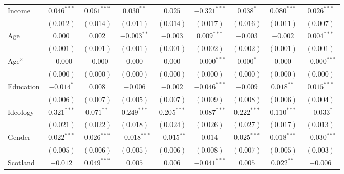 \documentclass{article}
\begin{document}
\begin{table}
\begin{center}
{\begin{tabular}{l c c c c c c c c }
Income                           & $0.046^{***}$  & $0.061^{***}$  & $0.030^{**}$   & $0.025$        & $-0.321^{***}$ & $0.038^{*}$    & $0.080^{***}$  & $0.026^{***}$  \\
                                 & $(0.012)$      & $(0.014)$      & $(0.011)$      & $(0.014)$      & $(0.017)$      & $(0.016)$      & $(0.011)$      & $(0.007)$      \\
Age                              & $0.000$        & $0.002$        & $-0.003^{**}$  & $-0.003$       & $0.009^{***}$  & $-0.003$       & $-0.002$       & $0.004^{***}$  \\
                                 & $(0.001)$      & $(0.001)$      & $(0.001)$      & $(0.001)$      & $(0.002)$      & $(0.002)$      & $(0.001)$      & $(0.001)$      \\
Age$^2$                            & $-0.000$       & $-0.000$       & $0.000$        & $0.000$        & $-0.000^{***}$ & $0.000^{*}$    & $0.000$        & $-0.000^{***}$ \\
                                 & $(0.000)$      & $(0.000)$      & $(0.000)$      & $(0.000)$      & $(0.000)$      & $(0.000)$      & $(0.000)$      & $(0.000)$      \\
Education                        & $-0.014^{*}$   & $0.008$        & $-0.006$       & $-0.002$       & $-0.046^{***}$ & $-0.009$       & $0.018^{**}$   & $0.015^{***}$  \\
                                 & $(0.006)$      & $(0.007)$      & $(0.005)$      & $(0.007)$      & $(0.009)$      & $(0.008)$      & $(0.006)$      & $(0.004)$      \\
Ideology                         & $0.321^{***}$  & $0.071^{**}$   & $0.249^{***}$  & $0.205^{***}$  & $-0.087^{***}$ & $0.222^{***}$  & $0.110^{***}$  & $-0.033^{*}$   \\
                                 & $(0.021)$      & $(0.022)$      & $(0.018)$      & $(0.024)$      & $(0.026)$      & $(0.027)$      & $(0.017)$      & $(0.013)$      \\
Gender                           & $0.022^{***}$  & $0.026^{***}$  & $-0.018^{***}$ & $-0.015^{**}$  & $0.014$        & $0.025^{***}$  & $0.018^{***}$  & $-0.030^{***}$ \\
                                 & $(0.005)$      & $(0.006)$      & $(0.005)$      & $(0.006)$      & $(0.008)$      & $(0.007)$      & $(0.005)$      & $(0.003)$      \\
Scotland                         & $-0.012$       & $0.049^{***}$  & $0.005$        & $0.006$        & $-0.041^{***}$ & $0.005$        & $0.022^{**}$   & $-0.006$       \\

\end{tabular}}
\end{center}
\end{table}
\end{document}
